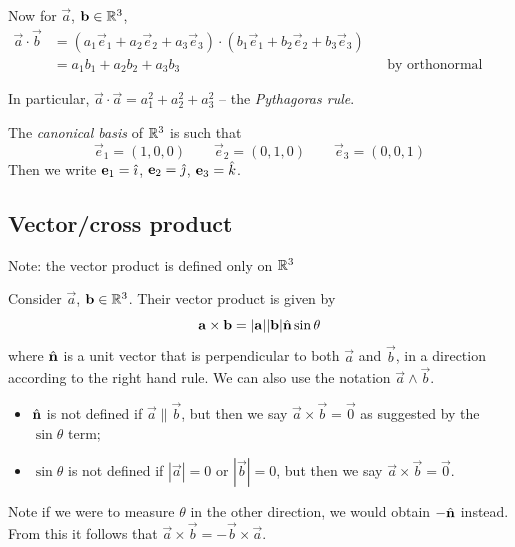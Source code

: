 \documentclass{../../template/note}
\begin{document}
    Now for \(\vec a\), \(\vec b \in \RR^3\),
    \begin{align*}
        \vec a \cdot \vec b &= (a_1\vec e_1 + a_2 \vec e_2 + a_3\vec e_3) \cdot (b_1\vec e_1 + b_2 \vec e_2 + b_3\vec e_3) \\
        &= a_1b_1 + a_2b_2 + a_3b_3 && \text{by orthonormal basis}
    \end{align*}
    
    In particular, \(\vec a \cdot \vec a = a_1^2 + a_2^2 + a_3^2\) -- the \emph{Pythagoras rule}.

    The \emph{canonical basis} of \(\mathbb R^3\) is such that
    \[
        \vec e_1 = (1, 0, 0) \qquad \vec e_2 = (0, 1, 0) \qquad \vec e_3 = (0, 0, 1)
    \]
    Then we write \(\vec e_1 = \ihat\), \(\vec e_2 = \jhat\), \(\vec e_3 = \khat\).

    \subsection{Vector/cross product}

    Note: the vector product is defined only on \(\mathbb R^3\)

    \begin{definition}
        Consider \(\vec a\), \(\vec b \in \RR^3\). Their vector product is given by
        \[
            \vec a \times \vec b = |\vec a||\vec b| \hvec n \sin \theta 
        \]
        where \(\hvec n\) is a unit vector that is perpendicular to both \(\vec a\) and \(\vec b\), in a direction according to the right hand rule. We can also use the notation \(\vec a \wedge \vec b\).
    \end{definition}

    \begin{remark}
        \begin{itemize}
            \item \(\hvec n\) is not defined if \(\vec a \parallel \vec b\), but then we say \(\vec a \times \vec b = \vec 0\) as suggested by the \(\sin \theta\) term;
            \item \(\sin \theta\) is not defined if \(|\vec a| = 0\) or \(|\vec b| = 0\), but then we say \(\vec a \times \vec b = \vec 0\).
        \end{itemize}
        
        
    \end{remark}
    
    

    \begin{remark}
        Note if we were to measure \(\theta\) in the other direction, we would obtain \(-\hvec n\) instead. From this it follows that \(\vec a \times \vec b = - \vec b \times \vec a\).
    \end{remark}
\end{document}

